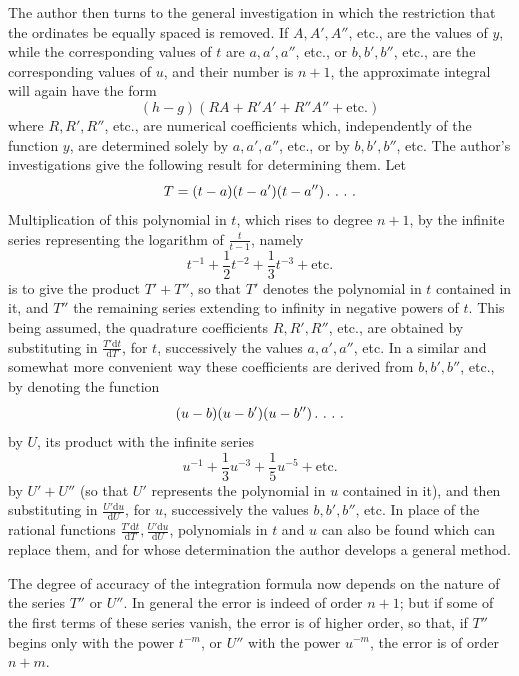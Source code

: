 The author then turns to the general investigation in which the restriction that the ordinates be equally spaced is removed. If \(A,A',A''\), etc., are the values of \(y\), while the corresponding values of \(t\) are \(a,a',a''\), etc., or \(b,b',b''\), etc., are the corresponding values of \(u\), and their number is \(n+1\), the approximate integral will again have the form
\[
(h-g)(RA+R'A'+R''A''+\text{etc.})
\]
where \(R,R',R''\), etc., are numerical coefficients which, independently of the function \(y\), are determined solely by \(a,a',a''\), etc., or by \(b,b',b''\), etc. The author's investigations give the following result for determining them. Let
\[
T=(t-a)(t-a')(t-a'')\,\ldotp\,\ldotp\,\ldotp\,\ldotp
\]
Multiplication of this polynomial in \(t\), which rises to degree \(n+1\), by the infinite series representing the logarithm of \(\frac{t}{t-1}\), namely
\[
t^{-1}+\frac12t^{-2}+\frac13t^{-3}+\text{etc.}
\]
is to give the product \(T'+T''\), so that \(T'\) denotes the polynomial in \(t\) contained in it, and \(T''\) the remaining series extending to infinity in negative powers of \(t\). This being assumed, the quadrature coefficients \(R,R',R''\), etc., are obtained by substituting in \(\frac{T'\mathrm{d}t}{\mathrm{d}T}\), for \(t\), successively the values \(a,a',a''\), etc. In a similar and somewhat more convenient way these coefficients are derived from \(b,b',b''\), etc., by denoting the function
\[
(u-b)(u-b')(u-b'')\,\ldotp\,\ldotp\,\ldotp\,\ldotp
\]
by \(U\), its product with the infinite series
\[
u^{-1}+\frac13u^{-3}+\frac15u^{-5}+\text{etc.}
\]
by \(U'+U''\) (so that \(U'\) represents the polynomial in \(u\) contained in it), and then substituting in \(\frac{U'\mathrm{d}u}{\mathrm{d}U}\), for \(u\), successively the values \(b,b',b''\), etc. In place of the rational functions \(\frac{T'\mathrm{d}t}{\mathrm{d}T},\frac{U'\mathrm{d}u}{\mathrm{d}U}\), polynomials in \(t\) and \(u\) can also be found which can replace them, and for whose determination the author develops a general method.

The degree of accuracy of the integration formula now depends on the nature of the series \(T''\) or \(U''\). In general the error is indeed of order \(n+1\); but if some of the first terms of these series vanish, the error is of higher order, so that, if \(T''\) begins only with the power \(t^{-m}\), or \(U''\) with the power \(u^{-m}\), the error is of order \(n+m\).


